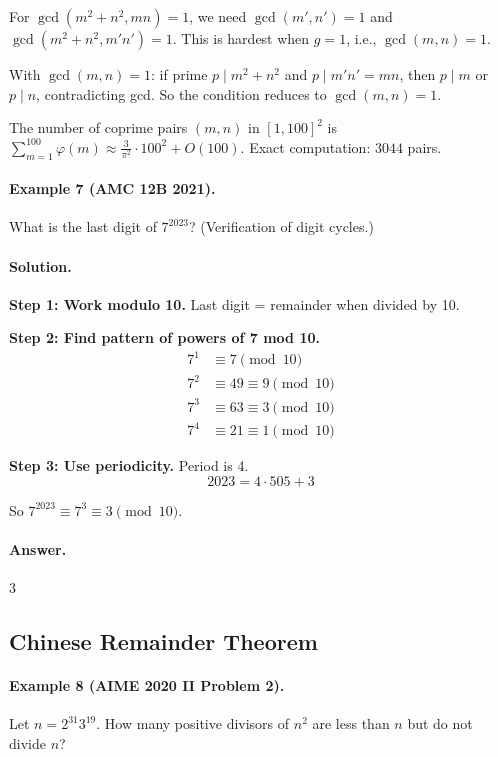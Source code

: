 \documentclass[12pt]{extarticle}
\begin{document}
For $\gcd(m^2+n^2,mn)=1$, we need $\gcd(m',n')=1$ and $\gcd(m^2+n^2,m'n')=1$. This is hardest when $g=1$, i.e., $\gcd(m,n)=1$.

With $\gcd(m,n)=1$: if prime $p\mid m^2+n^2$ and $p\mid m'n'=mn$, then $p\mid m$ or $p\mid n$, contradicting gcd. So the condition reduces to $\gcd(m,n)=1$.

The number of coprime pairs $(m,n)$ in $[1,100]^2$ is $\sum_{m=1}^{100}\varphi(m) \approx \frac{3}{\pi^2}\cdot 100^2+O(100)$. Exact computation: $\boxed{3044}$ pairs.

\paragraph{Example 7 (AMC 12B 2021).} What is the last digit of $7^{2023}$? (Verification of digit cycles.)

\paragraph{Solution.}
\textbf{Step 1: Work modulo 10.} Last digit = remainder when divided by 10.

\textbf{Step 2: Find pattern of powers of 7 mod 10.}
\begin{align*}
7^1 &\equiv 7 \pmod{10} \\
7^2 &\equiv 49 \equiv 9 \pmod{10} \\
7^3 &\equiv 63 \equiv 3 \pmod{10} \\
7^4 &\equiv 21 \equiv 1 \pmod{10}
\end{align*}

\textbf{Step 3: Use periodicity.} Period is 4.
\[
2023 = 4 \cdot 505 + 3
\]

So $7^{2023} \equiv 7^3 \equiv 3 \pmod{10}$.

\paragraph{Answer.} $\boxed{3}$

\subsection{Chinese Remainder Theorem}

\paragraph{Example 8 (AIME 2020 II Problem 2).} Let $n = 2^{31}3^{19}$. How many positive divisors of $n^2$ are less than $n$ but do not divide $n$?
\end{document}
